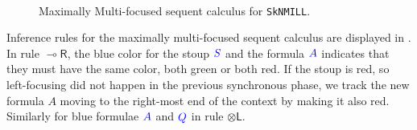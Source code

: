 \documentclass[runningheads]{llncs}
\newcommand{\tl}{\otimes \mathsf{L}}
\newcommand{\tr}{\otimes \mathsf{R}}
\newcommand{\lright}{{\multimap}\mathsf{R}}
\newcommand{\lleft}{{\multimap}\mathsf{L}}
\newcommand{\pass}{\mathsf{pass}}
\newcommand{\unitr}{\mathsf{IR}}
\newcommand{\otL}{\tl}
\newcommand{\otR}{\tr}
\newcommand{\lolliR}{\lright}
\newcommand{\lolliL}{\lleft}
\newcommand{\IR}{\unitr}
\newcommand{\ot}{\otimes}
\newcommand{\lolli}{\multimap}
\newcommand{\I}{\mathsf{I}}
\newcommand{\SkNMILL}{\texttt{SkNMILL}}
\newcommand{\red}[1]{{\color{red}#1}}
\newcommand{\blue}[1]{{\color{blue}#1}}
\newcommand{\green}[1]{{\color{green}#1}}
\newcommand{\up}{\Uparrow}
\newcommand{\dn}{\Downarrow}
\newcommand{\blurL}{\mathsf{blur_L}}
\newcommand{\blurR}{\mathsf{blur_R}}
\begin{document}
\begin{figure}[t]
\[\begin{array}{c}
    \end{array}
  \]
  \caption{Maximally Multi-focused sequent calculus for \SkNMILL.} 
  \label{fig:max-multi-focus}
\end{figure}

Inference rules for the maximally multi-focused sequent calculus are displayed in . In rule $\lolliR$, the blue color for the stoup $\blue{S}$ and the formula $\blue{A}$ indicates that they must have the same color, both green or both red. If the stoup is red, so left-focusing did not happen in the previous synchronous phase, we track the new formula $A$ moving to the right-most end of the context by making it also red.
Similarly for blue formulae $\blue{A}$ and $\blue{Q}$ in rule $\otL$.
\end{document}
